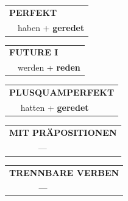 \documentclass[10pt,a4paper]{revtex4-2}
\begin{document}
\begin{verbbox}
    \vspace{10pt}

 \begin{tabular}{rl}
     \multicolumn{2}{l}{\textbf{PERFEKT}}\\
  &  haben + \textbf{geredet}\\
  \end{tabular}
\hfill
   \begin{tabular}{rl}
   
    \multicolumn{2}{l}{\textbf{FUTURE I} }\\
  &  werden + \textbf{reden}\\
 
  \end{tabular}
\hfill
   \begin{tabular}{rl}
      \multicolumn{2}{l}{\textbf{PLUSQUAMPERFEKT}}\\
  &  hatten + \textbf{geredet}\\
  \end{tabular}
  
  \vspace{10pt}



\begin{tabular}{lll}
\multicolumn{3}{l}{\textbf{MIT PRÄPOSITIONEN}}\\
& ---\\
\end{tabular}
\hfill
\begin{tabular}{lll}
\multicolumn{3}{l}{\textbf{TRENNBARE VERBEN}}\\
& ---\\
\end{tabular}

  \vspace{-5pt}

\end{verbbox}
\end{document}
